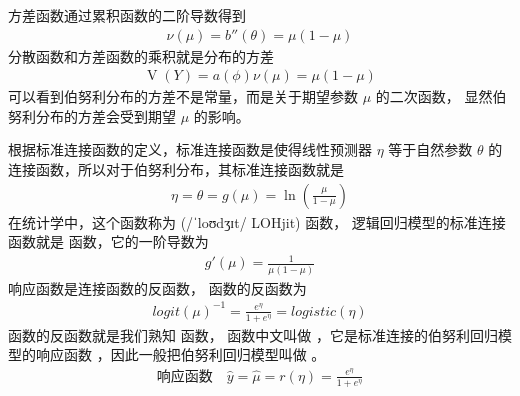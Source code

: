\documentclass[letterpaper,10pt,english]{sphinxmanual}
\begin{document}
方差函数通过累积函数的二阶导数得到
\begin{equation}\label{equation:二项模型/content:二项模型/content:6}
\begin{split}\nu(\mu) =  b''(\theta) = \mu(1-\mu)\end{split}
\end{equation}
分散函数和方差函数的乘积就是分布的方差
\begin{equation}\label{equation:二项模型/content:二项模型/content:7}
\begin{split}\mathop{V}(Y) = a(\phi)\nu(\mu) =  \mu(1-\mu)\end{split}
\end{equation}
可以看到伯努利分布的方差不是常量，而是关于期望参数 \(\mu\) 的二次函数，
显然伯努利分布的方差会受到期望 \(\mu\) 的影响。

根据标准连接函数的定义，标准连接函数是使得线性预测器 \(\eta\) 等于自然参数 \(\theta\)
的连接函数，所以对于伯努利分布，其标准连接函数就是
\begin{equation}\label{equation:二项模型/content:二项模型/content:8}
\begin{split}\eta=\theta = g(\mu) = \ln \left ( \frac{\mu}{1-\mu} \right )\end{split}
\end{equation}
在统计学中，这个函数称为  (/ˈloʊdʒɪt/ LOH\sphinxhyphen{}jit) 函数，
逻辑回归模型的标准连接函数就是  函数，它的一阶导数为
\begin{equation}\label{equation:二项模型/content:二项模型/content:9}
\begin{split}g'(\mu) = \frac{1}{\mu(1-\mu)}\end{split}
\end{equation}
响应函数是连接函数的反函数，
 函数的反函数为
\begin{equation}\label{equation:二项模型/content:二项模型/content:10}
\begin{split}logit(\mu)^{-1} = \frac{e^{\eta}}{1+e^{\eta}} = logistic(\eta)\end{split}
\end{equation}
 函数的反函数就是我们熟知  函数，
 函数中文叫做 
，它是标准连接的伯努利回归模型的响应函数
，因此一般把伯努利回归模型叫做 
。
\begin{equation}\label{equation:二项模型/content:二项模型/content:11}
\begin{split}\text{响应函数} \quad \hat{y} = \hat{\mu} = r(\eta) = \frac{e^{\eta}}{1+e^{\eta}}\end{split}
\end{equation}
\end{document}
